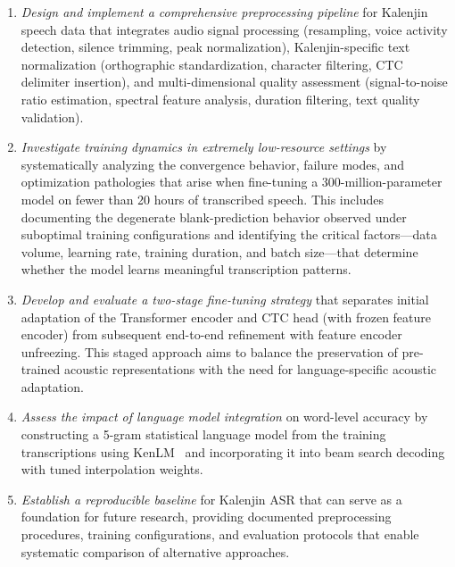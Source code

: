 \documentclass[journal]{IEEEtran}
\begin{document}
\begin{enumerate}[label=\arabic*)]
    \item \textit{Design and implement a comprehensive preprocessing pipeline} for Kalenjin speech data that integrates audio signal processing (resampling, voice activity detection, silence trimming, peak normalization), Kalenjin-specific text normalization (orthographic standardization, character filtering, CTC delimiter insertion), and multi-dimensional quality assessment (signal-to-noise ratio estimation, spectral feature analysis, duration filtering, text quality validation).

    \item \textit{Investigate training dynamics in extremely low-resource settings} by systematically analyzing the convergence behavior, failure modes, and optimization pathologies that arise when fine-tuning a 300-million-parameter model on fewer than 20 hours of transcribed speech. This includes documenting the degenerate blank-prediction behavior observed under suboptimal training configurations and identifying the critical factors---data volume, learning rate, training duration, and batch size---that determine whether the model learns meaningful transcription patterns.

    \item \textit{Develop and evaluate a two-stage fine-tuning strategy} that separates initial adaptation of the Transformer encoder and CTC head (with frozen feature encoder) from subsequent end-to-end refinement with feature encoder unfreezing. This staged approach aims to balance the preservation of pre-trained acoustic representations with the need for language-specific acoustic adaptation.

    \item \textit{Assess the impact of language model integration} on word-level accuracy by constructing a 5-gram statistical language model from the training transcriptions using KenLM~\cite{heafield2011kenlm} and incorporating it into beam search decoding with tuned interpolation weights.

    \item \textit{Establish a reproducible baseline} for Kalenjin ASR that can serve as a foundation for future research, providing documented preprocessing procedures, training configurations, and evaluation protocols that enable systematic comparison of alternative approaches.
\end{enumerate}

\end{document}
